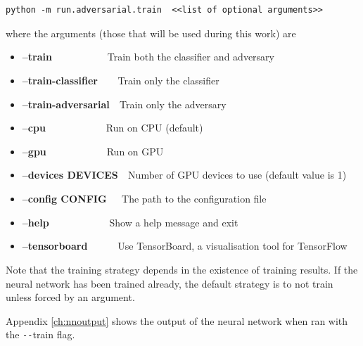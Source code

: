         \begin{lstlisting}
python -m run.adversarial.train  <<list of optional arguments>>\end{lstlisting}
        where the arguments (those that will be used during this work) are
        \begin{itemize}
            \item \textbf{--train}\verb|           |Train both the classifier and adversary
            \item \textbf{--train-classifier}\verb|    |Train only the classifier
            \item \textbf{--train-adversarial}\verb|  |Train only the adversary
            \item \textbf{--cpu}\verb|            |Run on CPU (default)
            \item \textbf{--gpu}\verb|            |Run on GPU
            \item \textbf{--devices DEVICES}\verb|  |Number of GPU devices to use (default value is 1)
            \item \textbf{--config CONFIG}\verb|   |The path to the configuration file
            \item \textbf{--help}\verb|            |Show a help message and exit
            \item \textbf{--tensorboard}\verb|      |Use TensorBoard, a visualisation tool for TensorFlow



        \end{itemize}
     
        Note that the training strategy depends in the existence of training results. If the neural network has been trained already, the default strategy is to not train unless forced by an argument.
        
        Appendix \ref{ch:nnoutput} shows the output of the neural network when ran with the \verb|--|train flag. 